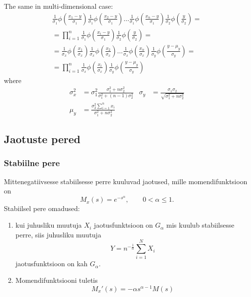 \documentclass[a4paper]{article}
\numberwithin{equation}{subsection}
\begin{document}
The same in multi-dimensional case:
\begin{multline}
  \frac{1}{\sigma_1}\phi\left( \frac{x_{1} - y}{\sigma_1} \right)
  \frac{1}{\sigma_1}\phi\left( \frac{x_{2} - y}{\sigma_1} \right)
  \dots
  \frac{1}{\sigma_1}\phi\left( \frac{x_{n} - y}{\sigma_1} \right)
  \frac{1}{\sigma_2}\phi\left( \frac{y}{\sigma_2} \right) 
  =
  \\
  =
  \prod_{i=1}^{n}
  \frac{1}{\sigma_1}\phi\left( \frac{x_{i} - y}{\sigma_1} \right)
  \frac{1}{\sigma_2}\phi\left( \frac{y}{\sigma_2} \right) 
  =
  \\
  =
  \frac{1}{\sigma_x}\phi\left( \frac{x_{1}}{\sigma_x} \right)
  \frac{1}{\sigma_x}\phi\left( \frac{x_{2}}{\sigma_x} \right)
  \dots
  \frac{1}{\sigma_x}\phi\left( \frac{x_{n}}{\sigma_x} \right)
  \frac{1}{\sigma_y}\phi\left( \frac{y-\mu_y}{\sigma_y} \right)
  =
  \\
  =
  \prod_{i=1}^{n}
  \frac{1}{\sigma_x}\phi\left( \frac{x_{i}}{\sigma_x} \right)
  \frac{1}{\sigma_y}\phi\left( \frac{y-\mu_y}{\sigma_y} \right)
  \label{eq:normaaljaotuste_korrutis}
\end{multline}
where
\begin{align*}
  \sigma_x^{2}
  &= 
  \sigma_{1}^{2}
  \frac{\sigma_1^2 + n \sigma_2^2}
  {\sigma_1^2 + (n - 1) \sigma_2^2}
  &
  \sigma_y 
  &= 
  \frac{\sigma_1 \sigma_2}
  {\sqrt{\sigma_1^2 + n \sigma_2^2}} 
  \\
  \mu_y 
  &=
  \frac{\sigma_2^2 \sum_{i=1}^{n} x_{i}}{\sigma_1^2 + n \sigma_2^2}
\end{align*}


\subsection{Jaotuste pered}

\subsubsection{Stabiilne pere}
Mittenegatiivsesse stabiilsesse perre kuuluvad jaotused, mille
momendifunktsioon on
\begin{equation}
M_x (s) = e^{-s^\alpha}, \qquad 0 < \alpha \le 1.
\end{equation}
Stabiilsel pere omadused:
\begin{enumerate}
\item kui juhusliku muutuja $X_i$ jaotusfunktsioon on $G_\alpha$ mis kuulub
  stabiilsesse perre, siis juhusliku muutuja
  \begin{equation}
    Y = n^{-\frac{1}{\alpha}} \sum_{i=1}^N X_i
  \end{equation}
  jaotusfunktsioon on kah $G_\alpha$.
\item Momendifunktsiooni tuletis
  \begin{equation}
    M_x'(s) = -\alpha s^{\alpha - 1} M(s)
  \end{equation}
\end{enumerate}
\end{document}
